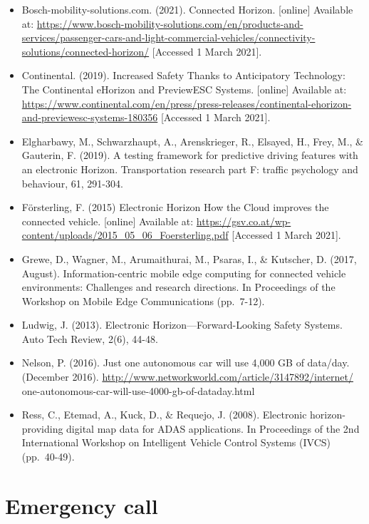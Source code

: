 \documentclass[
]{book}
\providecommand{\tightlist}{%
  \setlength{\itemsep}{0pt}\setlength{\parskip}{0pt}}
\begin{document}
\begin{itemize}
\tightlist
\item
  Bosch-mobility-solutions.com. (2021). Connected Horizon. {[}online{]} Available at: \url{https://www.bosch-mobility-solutions.com/en/products-and-services/passenger-cars-and-light-commercial-vehicles/connectivity-solutions/connected-horizon/} {[}Accessed 1 March 2021{]}.
\item
  Continental. (2019). Increased Safety Thanks to Anticipatory Technology: The Continental eHorizon and PreviewESC Systems. {[}online{]} Available at: \url{https://www.continental.com/en/press/press-releases/continental-ehorizon-and-previewesc-systems-180356} {[}Accessed 1 March 2021{]}.
\item
  Elgharbawy, M., Schwarzhaupt, A., Arenskrieger, R., Elsayed, H., Frey, M., \& Gauterin, F. (2019). A testing framework for predictive driving features with an electronic Horizon. Transportation research part F: traffic psychology and behaviour, 61, 291-304.
\item
  Försterling, F. (2015) Electronic Horizon How the Cloud improves the connected vehicle. {[}online{]} Available at: \url{https://gsv.co.at/wp-content/uploads/2015_05_06_Foersterling.pdf} {[}Accessed 1 March 2021{]}.
\item
  Grewe, D., Wagner, M., Arumaithurai, M., Psaras, I., \& Kutscher, D. (2017, August). Information-centric mobile edge computing for connected vehicle environments: Challenges and research directions. In Proceedings of the Workshop on Mobile Edge Communications (pp.~7-12).
\item
  Ludwig, J. (2013). Electronic Horizon---Forward-Looking Safety Systems. Auto Tech Review, 2(6), 44-48.
\item
  Nelson, P. (2016). Just one autonomous car will use 4,000 GB of data/day. (December 2016). \url{http://www.networkworld.com/article/3147892/internet/} one-autonomous-car-will-use-4000-gb-of-dataday.html
\item
  Ress, C., Etemad, A., Kuck, D., \& Requejo, J. (2008). Electronic horizon-providing digital map data for ADAS applications. In Proceedings of the 2nd International Workshop on Intelligent Vehicle Control Systems (IVCS) (pp.~40-49).
\end{itemize}

\hypertarget{ecall}{%
\section{Emergency call}\label{ecall}}
\end{document}
